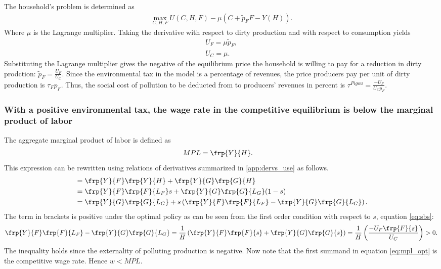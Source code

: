 The household's problem is determined as
\begin{align}
\underset{C,H,F}{\max} U(C,H,F)-\mu \left(C+\tilde{p}_FF-Y(H)\right).
\end{align}
Where $\mu$ is the Lagrange multiplier. Taking the derivative with respect to dirty production  and with respect to consumption yields
\begin{align}
U_F=\mu \tilde{p}_F,\\
U_C=\mu.
\end{align}
Substituting the Lagrange multiplier gives the negative of the equilibrium price the household is willing to pay for a reduction in dirty prodction: $\tilde{p}_F=\frac{U_F}{U_C}$. Since the environmental tax in the model is a percentage of revenues, the price producers pay per unit of dirty production is $\tau_F p_F$. Thus, the social cost of pollution to be deducted from to producers' revenues in percent is $\tau^{Pigou}=\frac{-U_F}{U_Cp_F}$.


\subsubsection{With a positive environmental tax, the wage rate in the competitive equilibrium is below the marginal product of labor}\label{app:wageMPL}

The aggregate marginal product of labor is defined as
\begin{align}
MPL&= \frp{Y}{H}.
\end{align}
This expression can be rewritten using relations of derivatives summarized in \ref{app:dervs_use} as follows.
\begin{align}
&= \frp{Y}{F}\frp{Y}{H}+\frp{Y}{G}\frp{G}{H}\\
&= \frp{Y}{F}\frp{F}{L_F}s+\frp{Y}{G}\frp{G}{L_G}(1-s)\\
&= \frp{Y}{G}\frp{G}{L_G}+ s\left(\frp{Y}{F}\frp{F}{L_F}-\frp{Y}{G}\frp{G}{L_G}\right).\label{eq:mpl_opt}
\end{align}
The term in brackets is positive under the optimal policy as can be seen from the first order condition with respect to $s$, equation \ref{eq:sbs}:
\begin{align}
\frp{Y}{F}\frp{F}{L_F}-\frp{Y}{G}\frp{G}{L_G}=\frac{1}{H}\left(\frp{Y}{F}\frp{F}{s}+\frp{Y}{G}\frp{G}{s}\right)=\frac{1}{H}\left(\frac{-U_F\frp{F}{s}}{U_C}\right)>0.
\end{align}
The inequality holds since the externality of polluting production is negative. %
Now note that the first summand in equation \ref{eq:mpl_opt} is the competitive wage rate.  Hence $w<MPL$.

